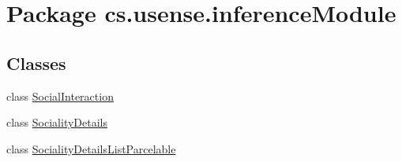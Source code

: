 \hypertarget{namespacecs_1_1usense_1_1inference_module}{}\section{Package cs.\+usense.\+inference\+Module}
\label{namespacecs_1_1usense_1_1inference_module}
\subsection*{Classes}
\begin{DoxyCompactItemize}
\item 
class \hyperlink{classcs_1_1usense_1_1inference_module_1_1_social_interaction}{Social\+Interaction}
\item 
class \hyperlink{classcs_1_1usense_1_1inference_module_1_1_sociality_details}{Sociality\+Details}
\item 
class \hyperlink{classcs_1_1usense_1_1inference_module_1_1_sociality_details_list_parcelable}{Sociality\+Details\+List\+Parcelable}
\end{DoxyCompactItemize}


